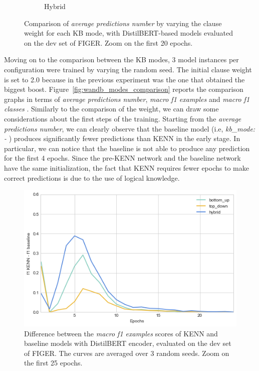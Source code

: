 \begin{figure}
\begin{subfigure}{0.8\textwidth}
         \caption{Hybrid}
     \end{subfigure}
        \caption{Comparison of \textit{average predictions number} by varying the clause weight for each KB mode, with DistilBERT-based models evaluated on the dev set of FIGER. Zoom on the first 20 epochs.}
        \label{fig:wandb_weights_avg_pred_start}
\end{figure}

Moving on to the comparison between the KB modes, 3 model instances per configuration were trained by varying the random seed. The initial clause weight is set to 2.0 because in the previous experiment was the one that obtained the biggest boost. Figure~\ref{fig:wandb_modes_comparison} reports the comparison graphs in terms of \textit{average predictions number}, \textit{macro f1 examples} and \textit{macro f1 classes }. Similarly to the comparison of the weight, we can draw some considerations about the first steps of the training. Starting from the \textit{average predictions number}, we can clearly observe that the baseline model (i.e, \textit{kb\_mode: - }) produces significantly fewer predictions than KENN in the early stage. In particular, we can notice that the baseline is not able to produce any prediction for the first 4 epochs. Since the pre-KENN network and the baseline network have the same initialization, the fact that KENN requires fewer epochs to make correct predictions is due to the use of logical knowledge.

\begin{figure}[h]
    \centering
    \includegraphics[scale=0.4]{figures/initial_boost.png}
    \caption{Difference between the \textit{macro f1 examples} scores of KENN and baseline models with DistilBERT encoder, evaluated on the dev set of FIGER. The curves are averaged over 3 random seeds. Zoom on the first 25 epochs.}
    \label{fig:initial_boost}
\end{figure}

